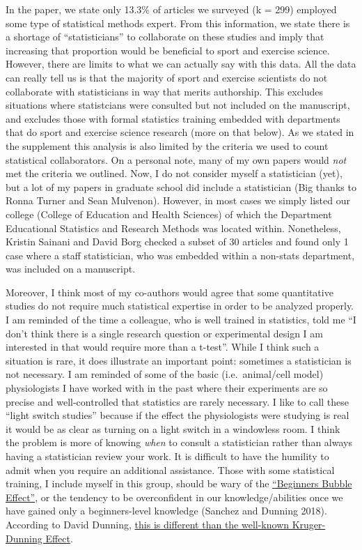\documentclass[
]{article}
\begin{document}
In the paper, we state only 13.3\% of articles we surveyed (k = 299)
employed some type of statistical methods expert. From this information,
we state there is a shortage of ``statisticians'' to collaborate on
these studies and imply that increasing that proportion would be
beneficial to sport and exercise science. However, there are limits to
what we can actually say with this data. All the data can really tell us
is that the majority of sport and exercise scientists do not collaborate
with statisticians in way that merits authorship. This excludes
situations where statistcians were consulted but not included on the
manuscript, and excludes those with formal statistics training embedded
with departments that do sport and exercise science research (more on
that below). As we stated in the supplement this analysis is also
limited by the criteria we used to count statistical collaborators. On a
personal note, many of my own papers would \emph{not} met the criteria
we outlined. Now, I do not consider myself a statistician (yet), but a
lot of my papers in graduate school did include a statistician (Big
thanks to Ronna Turner and Sean Mulvenon). However, in most cases we
simply listed our college (College of Education and Health Sciences) of
which the Department Educational Statistics and Research Methods was
located within. Nonetheless, Kristin Sainani and David Borg checked a
subset of 30 articles and found only 1 case where a staff statistician,
who was embedded within a non-stats department, was included on a
manuscript.

Moreover, I think most of my co-authors would agree that some
quantitative studies do not require much statistical expertise in order
to be analyzed properly. I am reminded of the time a colleague, who is
well trained in statistics, told me ``I don't think there is a single
research question or experimental design I am interested in that would
require more than a t-test''. While I think such a situation is rare, it
does illustrate an important point: sometimes a statistician is not
necessary. I am reminded of some of the basic (i.e.~animal/cell model)
physiologists I have worked with in the past where their experiments are
so precise and well-controlled that statistics are rarely necessary. I
like to call these ``light switch studies'' because if the effect the
physiologists were studying is real it would be as clear as turning on a
light switch in a windowless room. I think the problem is more of
knowing \emph{when} to consult a statistician rather than always having
a statistician review your work. It is difficult to have the humility to
admit when you require an additional assistance. Those with some
statistical training, I include myself in this group, should be wary of
the \href{https://psycnet.apa.org/record/2017-49272-001}{``Beginners
Bubble Effect''}, or the tendency to be overconfident in our
knowledge/abilities once we have gained only a beginners-level knowledge
(Sanchez and Dunning 2018). According to David Dunning,
\href{https://twitter.com/daviddunning6/status/1263509341002518528?s=20}{this
is different than the well-known Kruger-Dunning Effect}.
\end{document}
